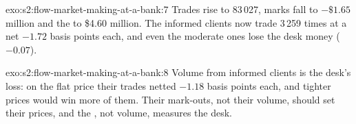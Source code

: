 \begin{solution}{exo:s2:flow-market-making-at-a-bank:7}
Trades rise to 83\,027, marks fall to $-\$1.65$ million and the  to \$4.60 million. The informed clients now trade 3\,259 times at a
net $-1.72$ basis points each, and even the moderate ones lose the desk money ($-0.07$).
\end{solution}

\begin{solution}{exo:s2:flow-market-making-at-a-bank:8}
Volume from informed clients is the desk's loss: on the flat price their trades netted $-1.18$ basis points each, and tighter prices would win more of
them. Their mark-outs, not their volume, should set their prices, and the , not volume, measures the desk.
\end{solution}

